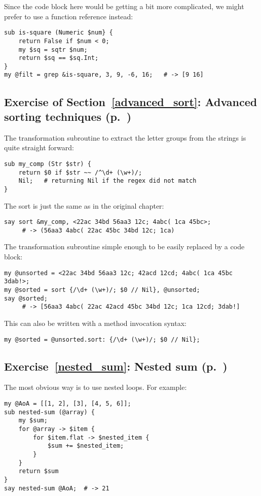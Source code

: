 {Since the code block here would be getting a bit more 
complicated, we might prefer to use a function 
reference instead:

\begin{verbatim}
sub is-square (Numeric $num} { 
    return False if $num < 0;
    my $sq = sqtr $num;
    return $sq == $sq.Int;
} 
my @filt = grep &is-square, 3, 9, -6, 16;   # -> [9 16]
\end{verbatim}
%
\subsection{Exercise of Section~\ref{advanced_sort}: Advanced sorting techniques (p.~\pageref{sort_exercise})}
\label{sol_sort_exercise}

The transformation subroutine to extract the letter groups from the strings is quite straight forward:

\begin{verbatim}
sub my_comp (Str $str) {
    return $0 if $str ~~ /^\d+ (\w+)/; 
    Nil;   # returning Nil if the regex did not match
}
\end{verbatim}
%
The sort is just the same as in the original chapter:
\begin{verbatim}
say sort &my_comp, <22ac 34bd 56aa3 12c; 4abc( 1ca 45bc>;
     # -> (56aa3 4abc( 22ac 45bc 34bd 12c; 1ca)
\end{verbatim}

The transformation subroutine simple enough to be easily 
replaced by a code block:

\begin{verbatim}
my @unsorted = <22ac 34bd 56aa3 12c; 42acd 12cd; 4abc( 1ca 45bc 3dab!>;
my @sorted = sort {/\d+ (\w+)/; $0 // Nil}, @unsorted;
say @sorted; 
     # -> [56aa3 4abc( 22ac 42acd 45bc 34bd 12c; 1ca 12cd; 3dab!]
\end{verbatim}
%
This can also be written with a method invocation syntax:
\begin{verbatim}
my @sorted = @unsorted.sort: {/\d+ (\w+)/; $0 // Nil};
\end{verbatim}
%

\subsection{Exercise~\ref{nested_sum}: Nested sum (p.~\pageref{nested_sum})}
\label{sol_nested_sum}

The most obvious way is to use nested loops. For example:

\begin{verbatim}
my @AoA = [[1, 2], [3], [4, 5, 6]];
sub nested-sum (@array) { 
    my $sum; 
    for @array -> $item { 
        for $item.flat -> $nested_item {
            $sum += $nested_item;
        }
    } 
    return $sum
}
say nested-sum @AoA;  # -> 21
\end{verbatim}

}
